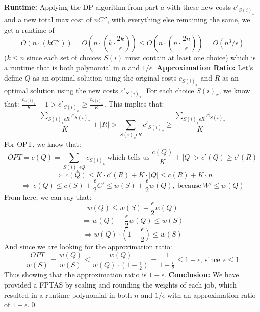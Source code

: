 \documentclass[oneside]{homework} %
\begin{document}
\textbf{Runtime:} 
\newline
Applying the DP algorithm from part $a$ with these new costs $c'_{S(i)_x}$ and a new total max cost of $nC''$, with everything else remaining the same, we get a runtime of $$O(n\cdot(kC'')) = O(n\cdot(k\cdot\frac{2k}{\epsilon})) \leq O(n\cdot(n\cdot\frac{2n}{\epsilon})) = O(n^3/\epsilon)$$ ($k \leq n$ since each set of choices $S(i)$ must contain at least one choice) which is a runtime that is both polynomial in $n$ and $1/\epsilon$.
\newline
\newline
\textbf{Approximation Ratio:} 
\newline
Let's define $Q$ as an optimal solution using the original costs $c_{S(i)_x}$ and $R$ as an optimal solution using the new costs $c'_{S(i)_x}$.
\newline
For each choice $S(i)_x$, we know that: $\frac{c_{S(i)_x}}{K} - 1 > c'_{S(i)_x} \geq \frac{c_{S(i)_x}}{K}$. This implies that: 
$$\frac{\sum\limits_{S(i)_x\epsilon R}c_{S(i)_x}}{K} + |R| > \sum\limits_{S(i)_x\epsilon R}c'_{S(i)_x} \geq \frac{\sum\limits_{S(i)_x\epsilon R}c_{S(i)_x}}{K}$$
For OPT, we know that: 
$$OPT = c(Q) = \sum\limits_{S(i)_x\epsilon Q}c_{S(i)_x} \ \text{which tells us} \ \frac{c(Q)}{K} + |Q| > c'(Q) \geq c'(R)$$ 
$$\Longrightarrow \ c(Q) \leq K \cdot c'(R) + K \cdot |Q| \leq c(R) + K \cdot n$$
$$\Longrightarrow \ c(Q) \leq c(S) + \frac{\epsilon}{2}C' \leq w(S) + \frac{\epsilon}{2}w(Q), \ \text{because} \ W' \leq w(Q)$$
From here, we can say that:
$$w(Q) \leq w(S) + \frac{\epsilon}{2}w(Q)$$
$$\Longrightarrow w(Q) - \frac{\epsilon}{2}w(Q) \leq w(S)$$
$$\Longrightarrow w(Q) \cdot (1 - \frac{\epsilon}{2}) \leq w(S)$$
And since we are looking for the approximation ratio:
$$\frac{OPT}{w(S)} = \frac{w(Q)}{w(S)} \leq \frac{w(Q)}{w(Q) \cdot (1 - \frac{\epsilon}{2})} = \frac{1}{1 - \frac{\epsilon}{2}} \leq 1 + \epsilon, \ \text{since} \ \ \epsilon \leq 1$$
Thus showing that the approximation ratio is $1 + \epsilon$.
\newline
\newline
\textbf{Conclusion:} We have provided a FPTAS by scaling and rounding the weights of each job, which resulted in a runtime polynomial in both $n$ and $1/\epsilon$ with an approximation ratio of $1 + \epsilon$.\hfill\qed
\end{document}
